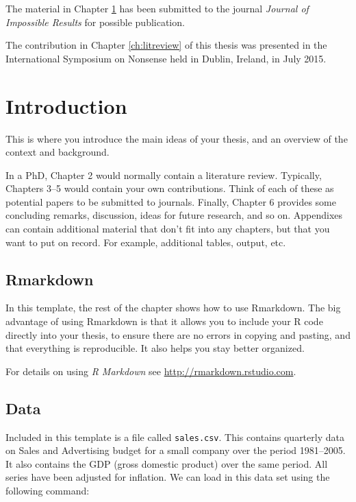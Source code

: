 \documentclass{aucklandthesis}
\begin{document}
The material in Chapter \ref{ch:intro} has been submitted to the journal \emph{Journal of Impossible Results} for possible publication.

The contribution in Chapter \ref{ch:litreview} of this thesis was presented in the International Symposium on Nonsense held in Dublin, Ireland, in July 2015.

\clearpage{}\setcounter{page}{0}

\hypertarget{ch:intro}{%
\chapter{Introduction}\label{ch:intro}}

This is where you introduce the main ideas of your thesis, and an overview of the context and background.

In a PhD, Chapter 2 would normally contain a literature review. Typically, Chapters 3--5 would contain your own contributions. Think of each of these as potential papers to be submitted to journals. Finally, Chapter 6 provides some concluding remarks, discussion, ideas for future research, and so on. Appendixes can contain additional material that don't fit into any chapters, but that you want to put on record. For example, additional tables, output, etc.

\hypertarget{rmarkdown}{%
\section{Rmarkdown}\label{rmarkdown}}

In this template, the rest of the chapter shows how to use Rmarkdown. The big advantage of using Rmarkdown is that it allows you to include your R code directly into your thesis, to ensure there are no errors in copying and pasting, and that everything is reproducible. It also helps you stay better organized.

For details on using \emph{R Markdown} see \url{http://rmarkdown.rstudio.com}.

\hypertarget{data}{%
\section{Data}\label{data}}

Included in this template is a file called \texttt{sales.csv}. This contains quarterly data on Sales and Advertising budget for a small company over the period 1981--2005. It also contains the GDP (gross domestic product) over the same period. All series have been adjusted for inflation. We can load in this data set using the following command:
\end{document}
